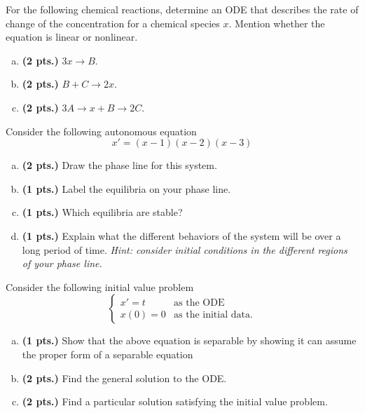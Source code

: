 \documentclass[12pt]{amsbook}
\begin{document}
\begin{problem}
For the following chemical reactions, determine an ODE that describes the rate of change of the concentration for a chemical species $x$.  Mention whether the equation is linear or nonlinear.
\begin{enumerate}[(a)]
    \item \textbf{(2 pts.)} $3x \to B$.
    \item \textbf{(2 pts.)} $B+C \to 2x$.
    \item \textbf{(2 pts.)} $3A\to x+B \to 2C$.
\end{enumerate}
\end{problem}

\begin{problem}
Consider the following autonomous equation
\[
x' = (x-1)(x-2)(x-3)
\]
\begin{enumerate}[(a)]
    \item \textbf{(2 pts.)} Draw the phase line for this system.
    \item \textbf{(1 pts.)} Label the equilibria on your phase line.
    \item \textbf{(1 pts.)} Which equilibria are stable?
    \item \textbf{(1 pts.)} Explain what the different behaviors of the system will be over a long period of time. \emph{Hint: consider initial conditions in the different regions of your phase line.}
\end{enumerate}
\end{problem}

\begin{problem}
Consider the following initial value problem
\[
\begin{cases}
x' = t  & \textrm{as the ODE}\\
x(0) = 0 & \textrm{as the initial data}.
\end{cases}
\]
\begin{enumerate}[(a)]
    \item \textbf{(1 pts.)} Show that the above equation is separable by showing it can assume the proper form of a separable equation
	\item \textbf{(2 pts.)} Find the general solution to the ODE.
	\item \textbf{(2 pts.)} Find a particular solution satisfying the initial value problem.
\end{enumerate}
\end{problem}
\end{document}
